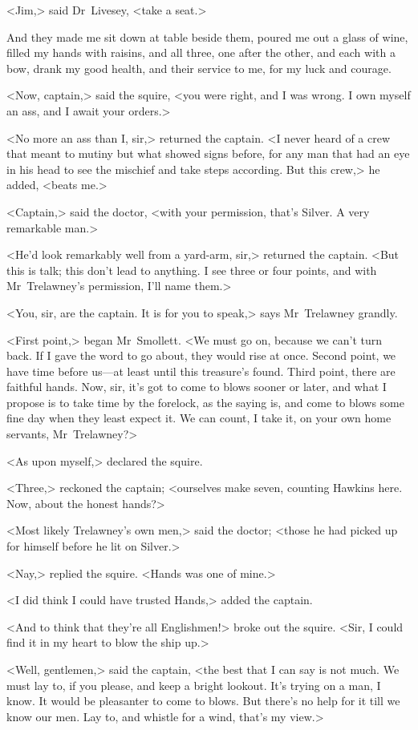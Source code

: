 <Jim,> said Dr~Livesey, <take a seat.>

And they made me sit down at table beside them, poured me out a glass of wine, filled my hands with raisins, and all three, one after the other, and each with a bow, drank my good health, and their service to me, for my luck and courage.

<Now, captain,> said the squire, <you were right, and I was wrong. I own myself an ass, and I await your orders.>

<No more an ass than I, sir,> returned the captain. <I never heard of a crew that meant to mutiny but what showed signs before, for any man that had an eye in his head to see the mischief and take steps according. But this crew,> he added, <beats me.>

<Captain,> said the doctor, <with your permission, that's Silver. A very remarkable man.>

<He'd look remarkably well from a yard-arm, sir,> returned the captain. <But this is talk; this don't lead to anything. I see three or four points, and with Mr~Trelawney's permission, I'll name them.>

<You, sir, are the captain. It is for you to speak,> says Mr~Trelawney grandly.

<First point,> began Mr~Smollett. <We must go on, because we can't turn back. If I gave the word to go about, they would rise at once. Second point, we have time before us—at least until this treasure's found. Third point, there are faithful hands. Now, sir, it's got to come to blows sooner or later, and what I propose is to take time by the forelock, as the saying is, and come to blows some fine day when they least expect it. We can count, I take it, on your own home servants, Mr~Trelawney?>

<As upon myself,> declared the squire.

<Three,> reckoned the captain; <ourselves make seven, counting Hawkins here. Now, about the honest hands?>

<Most likely Trelawney's own men,> said the doctor; <those he had picked up for himself before he lit on Silver.>

<Nay,> replied the squire. <Hands was one of mine.>

<I did think I could have trusted Hands,> added the captain.

<And to think that they're all Englishmen!> broke out the squire. <Sir, I could find it in my heart to blow the ship up.>

<Well, gentlemen,> said the captain, <the best that I can say is not much. We must lay to, if you please, and keep a bright lookout. It's trying on a man, I know. It would be pleasanter to come to blows. But there's no help for it till we know our men. Lay to, and whistle for a wind, that's my view.>


